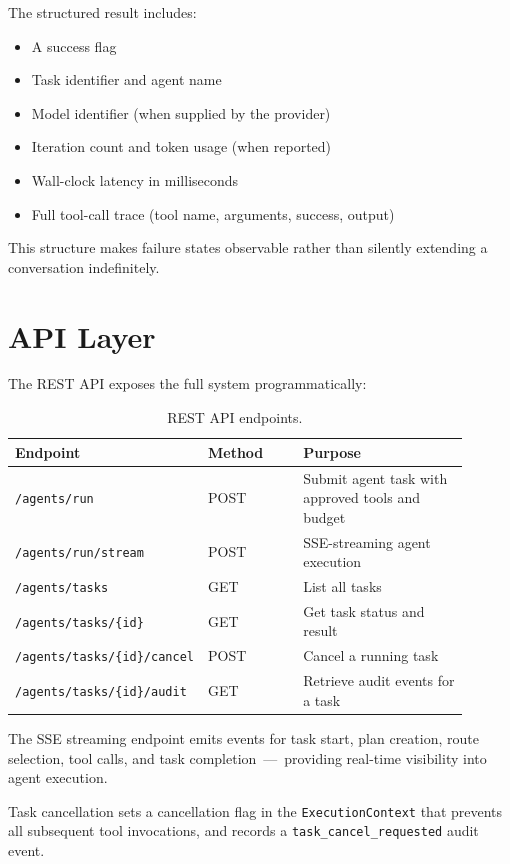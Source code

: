 \documentclass[11pt]{article}
\begin{document}
The structured result includes:
\begin{itemize}[leftmargin=*]
  \item A success flag
  \item Task identifier and agent name
  \item Model identifier (when supplied by the provider)
  \item Iteration count and token usage (when reported)
  \item Wall-clock latency in milliseconds
  \item Full tool-call trace (tool name, arguments, success, output)
\end{itemize}

This structure makes failure states observable rather than silently extending a conversation indefinitely.

\section{API Layer}

The REST API exposes the full system programmatically:

\begin{table}[ht]
\centering
\caption{REST API endpoints.}
\label{tab:api}
\begin{tabular}{p{0.28\linewidth} p{0.22\linewidth} p{0.40\linewidth}}
\toprule
\textbf{Endpoint} & \textbf{Method} & \textbf{Purpose} \\
\midrule
\texttt{/agents/run} & POST & Submit agent task with approved tools and budget \\
\texttt{/agents/run/stream} & POST & SSE-streaming agent execution \\
\texttt{/agents/tasks} & GET & List all tasks \\
\texttt{/agents/tasks/\{id\}} & GET & Get task status and result \\
\texttt{/agents/tasks/\{id\}/cancel} & POST & Cancel a running task \\
\texttt{/agents/tasks/\{id\}/audit} & GET & Retrieve audit events for a task \\
\bottomrule
\end{tabular}
\end{table}

The SSE streaming endpoint emits events for task start, plan creation, route selection, tool calls, and task completion\ ---\ providing real-time visibility into agent execution.

Task cancellation sets a cancellation flag in the \texttt{ExecutionContext} that prevents all subsequent tool invocations, and records a \texttt{task\_cancel\_requested} audit event.
\end{document}
